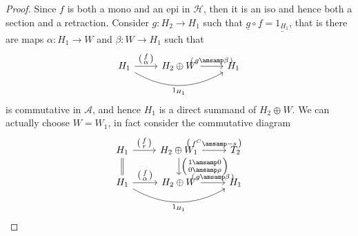 \begin{proof}
  Since $f$ is both a mono and an epi in $\mathcal{H}$, then it is an iso and hence
  both a section and a retraction. Consider $g:H_2\to H_1$ such that
  $\underline{g}\circ\underline{f} = \underline{1_{H_1}}$, that is there are maps $\alpha:H_1\to W$ and
  $\beta:W\to H_1$ such that
  \begin{equation*}
    \begin{tikzcd}
      H_1\arrow{r}{
        \begin{psmallmatrix}
          f\\ \alpha
        \end{psmallmatrix}
      }\arrow[bend right]{rr}[']{1_{H_1}}
      & H_2\oplus W \arrow{r}{
        \begin{psmallmatrix}
          g\amsamp \beta
        \end{psmallmatrix}
        }
        & H_1
    \end{tikzcd}
  \end{equation*}
  is commutative in $\mathcal{A}$, and hence $H_1$ is a direct summand of $H_2\oplus W$. We can actually choose $W=W_1$,
  in fact consider the commutative diagram
  \begin{equation*}
    \begin{tikzcd}
      H_1\arrow[equal]{d}\arrow{r}{
        \begin{psmallmatrix}
          f \\ r
        \end{psmallmatrix}
      }
        & H_2\oplus W_1 \arrow{r}{
          \begin{psmallmatrix}
            f^C \amsamp -s
          \end{psmallmatrix}
        }\arrow{d}{
          \begin{psmallmatrix}
            1 \amsamp 0\\
            0 \amsamp \rho
          \end{psmallmatrix}
        }
          & T_2
      \\
      H_1\arrow{r}{
        \begin{psmallmatrix}
          f\\ \alpha
        \end{psmallmatrix}
      }\arrow[bend right]{rr}[']{1_{H_1}}
      & H_2\oplus W \arrow{r}{
        \begin{psmallmatrix}
          g\amsamp \beta
        \end{psmallmatrix}
        }
        & H_1
    \end{tikzcd}
  \end{equation*}

\end{proof}
